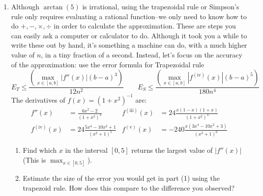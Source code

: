 \documentclass[11pt]{article}
\newcommand{\red}{\textcolor{red}}
\begin{document}
\begin{enumerate}
        \newpage
        \item Although $\arctan(5)$ is irrational, using the trapezoidal rule or Simpson's rule only requires evaluating a rational function--we only need to know how to do $+,-,\times,\div$ in order to calculate the approximation. These are steps you can easily ask a computer or calculator to do. Although it took you a while to write these out by hand, it's something a machine can do, with a much higher value of $n$, in a tiny fraction of a second. Instead, let's focus on the accuracy of the approximation: use the error formula for Trapezoidal rule
        $$E_T \le \frac{(\max_{x\in [a,b]} |f''(x)|(b-a)^3)}{12 n^2} \qquad E_S \le \frac{(\max_{x\in [a,b]} |f^{(\mathrm{iv})}(x)|(b-a)^5)}{180 n^4}
        $$ 
        The derivatives of $f(x) = (1+x^2)^{-1}$ are:
        \begin{align*} 
        f''(x) &= \frac{6x^2-2}{(1+x^2)^3}
        &
        f^{(\mathrm{iii})}(x) &= 24\frac{x(1-x)(1+x)}{(1+x^2)^4} \\
        f^{(\mathrm{iv})}(x) &= 24\frac{5x^4 - 10x^2 + 1}{(x^2 + 1)^5}
        &
        f^{(\mathrm{v})}(x) &= -240\frac{x(3x^4 - 10x^2 + 3)}{(x^2 + 1)^6}
        \end{align*}
        \begin{enumerate}
            \item Find which $x$ in the interval $[0,5]$ returns the largest value of $|f''(x)|$ (This is $\max_{x\in[0,5]}$).\vfill
            
            
            \item Estimate the size of the error you would get in part (1) using the trapezoid rule. How does this compare to the difference you observed?\vfill
            


\end{enumerate}
\end{enumerate}
\end{document}
